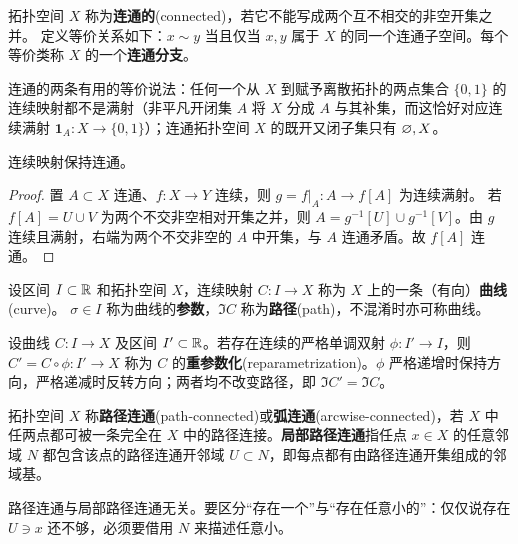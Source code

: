 \begin{definition}
    拓扑空间 $X$ 称为\textbf{连通的}(connected)，若它不能写成两个互不相交的非空开集之并。
    定义等价关系如下：$x \sim y$ 当且仅当 $x,y$ 属于 $X$ 的同一个连通子空间。每个等价类称 $X$ 的一个\textbf{连通分支}。
\end{definition}
\begin{theorem}
    连通的两条有用的等价说法：任何一个从 $X$ 到赋予离散拓扑的两点集合 $\{0,1\}$ 的连续映射都不是满射（非平凡开闭集 $A$ 将 $X$ 分成 $A$ 与其补集，而这恰好对应连续满射 $\mathbf1_A:X\to\{0,1\}$）；连通拓扑空间 $X$ 的既开又闭子集只有 $\varnothing,X$。
\end{theorem}

\begin{theorem}
    连续映射保持连通。
\end{theorem}
\begin{proof}
    置 $A\subset X$ 连通、$f:X\to Y$ 连续，则 $g=f|_A:A\to f[A]$ 为连续满射。
    若 $f[A]=U\cup V$ 为两个不交非空相对开集之并，则 $A=g^{-1}[U]\cup g^{-1}[V]$。由 $g$ 连续且满射，右端为两个不交非空的 $A$ 中开集，与 $A$ 连通矛盾。故 $f[A]$ 连通。
\end{proof}

\begin{definition}
    设区间 $I\subset\mathbb{R}$ 和拓扑空间 $X$，连续映射 $C:I\to X$ 称为 $X$ 上的一条（有向）\textbf{曲线}(curve)。
    $\sigma\in I$ 称为曲线的\textbf{参数}，$\Im C$ 称为\textbf{路径}(path)，不混淆时亦可称曲线。
\end{definition}

\begin{definition}
    设曲线 $C:I\to X$ 及区间 $I'\subset\mathbb{R}$。若存在连续的严格单调双射 $\phi:I'\to I$，则 $C'=C\circ\phi:I'\to X$ 称为 $C$ 的\textbf{重参数化}(reparametrization)。$\phi$ 严格递增时保持方向，严格递减时反转方向；两者均不改变路径，即 $\Im C'=\Im C$。
\end{definition}

\begin{definition}
    拓扑空间 $X$ 称\textbf{路径连通}(path-connected)或\textbf{弧连通}(arcwise-connected)，若 $X$ 中任两点都可被一条完全在 $X$ 中的路径连接。\textbf{局部路径连通}指任点 $x\in X$ 的任意邻域 $N$ 都包含该点的路径连通开邻域 $U\subset N$，即每点都有由路径连通开集组成的邻域基。
\end{definition}
\begin{remark}
    路径连通与局部路径连通无关。要区分“存在一个”与“存在任意小的”：仅仅说存在 $U\ni x$ 还不够，必须要借用 $N$ 来描述任意小。
\end{remark}

